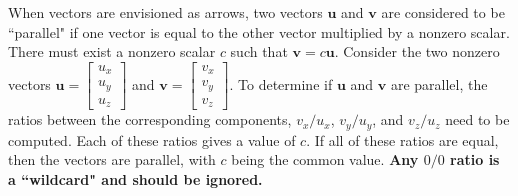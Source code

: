 \documentclass{article}
\begin{document}
When vectors are envisioned as arrows, two vectors \(\mathbf{u}\) and \(\mathbf{v}\) are considered to be ``parallel" if one vector is equal to the other vector multiplied by a nonzero scalar. There must exist a nonzero scalar \(c\) such that \(\mathbf{v} = c\mathbf{u}\). Consider the two nonzero vectors \(\mathbf{u} = \begin{bmatrix} u_x \\ u_y \\ u_z \end{bmatrix}\) and \(\mathbf{v} = \begin{bmatrix} v_x \\ v_y \\ v_z \end{bmatrix}\). To determine if \(\mathbf{u}\) and \(\mathbf{v}\) are parallel, the ratios between the corresponding components, \(v_x/u_x\), \(v_y/u_y\), and \(v_z/u_z\) need to be computed. Each of these ratios gives a value of \(c\). If all of these ratios are equal, then the vectors are parallel, with \(c\) being the common value. {\bf Any \(0/0\) ratio is a ``wildcard" and should be ignored.} 
\end{document}
